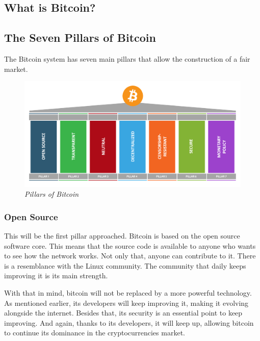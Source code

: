 \documentclass{article}
\newcommand\tab[1][1cm]{\hspace*{#1}}
\begin{document}
\subsection{What is Bitcoin?}

\subsection{The Seven Pillars of Bitcoin}

\tab The Bitcoin system has seven main pillars that allow the construction of a fair market. 

\begin{figure}[H]
    \begin{center}
        \includegraphics[width=\textwidth]{images/pillars.png}
        \caption{\textit{Pillars of Bitcoin}}
    \end{center}
\end{figure}

\subsubsection{Open Source}

\tab This will be the first pillar approached. Bitcoin is based on the open source software core. This means that the source code is available to anyone who wants to see how the network works. Not only that, anyone can contribute to it. There is a resemblance with the Linux community. The community that daily keeps improving it is its main strength.

With that in mind, bitcoin will not be replaced by a more powerful technology. As mentioned earlier, its developers will keep improving it, making it evolving alongside the internet. Besides that, its security is an essential point to keep improving. And again, thanks to its developers, it will keep up, allowing bitcoin to continue its dominance in the cryptocurrencies market.
\end{document}
